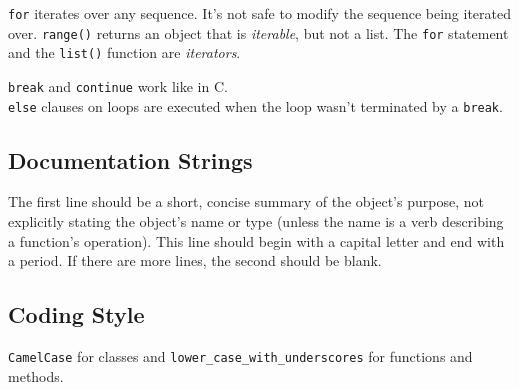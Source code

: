 \verb=for= iterates over any sequence.
It's not safe to modify the sequence being iterated over.
\verb=range()= returns an object that is \emph{iterable}, but not a list.
The \verb=for= statement and the \verb=list()= function are \emph{iterators}.

\verb=break= and \verb=continue= work like in C.\\
\verb=else= clauses on loops
are executed when the loop wasn't terminated by a \verb=break=.

\subsection{Documentation Strings}

The first line should be a short, concise summary of the object's purpose,
not explicitly stating the object's name or type
(unless the name is a verb describing a function's operation).
This line should begin with a capital letter and end with a period.
If there are more lines, the second should be blank.

\subsection{Coding Style}
\verb=CamelCase= for classes
and \verb=lower_case_with_underscores= for functions and methods.
